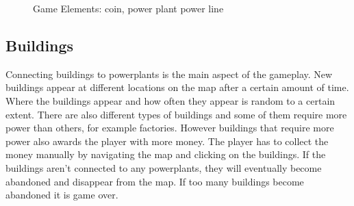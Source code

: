     \begin{figure}[!ht]
    \centering
    \caption{Game Elements: coin, power plant power line}
    \end{figure}


\subsection*{Buildings}
    Connecting buildings to powerplants is the main aspect of the gameplay. New buildings appear at 
    different locations on the map after a certain amount of time. Where the buildings appear and how 
    often they appear is random to a certain extent. There are also different types of buildings and 
    some of them require more power than others, for example factories. However buildings that require 
    more power also awards the player with more money. The player has to collect the money manually 
    by navigating the map and clicking on the buildings. If the buildings aren't connected to any 
    powerplants, they will eventually become abandoned and disappear from the map. If too many buildings 
    become abandoned it is game over.

